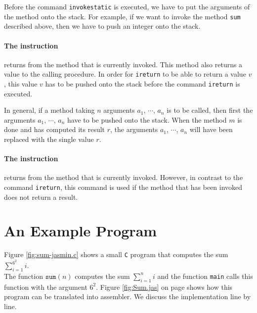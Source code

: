 Before the command \texttt{invokestatic} is executed, we have to put the arguments of the method
onto the stack.  For example, if we want to invoke the method \texttt{sum} described  above, then we
have to push an integer onto the stack.


\paragraph{The instruction }
returns from the method that is currently invoked.  This method also returns a value to the calling
procedure.  In order for \texttt{ireturn} to be able to return a value $v$, this value $v$ has to be
pushed onto the stack before the command \texttt{ireturn} is executed.

In general, if a method taking $n$ arguments $a_1$, $\cdots$, $a_n$ is to be called, then first the
arguments $a_1$, $\cdots$, $a_n$ have to be pushed onto the stack.  When the method $m$ is done and
has computed its result $r$, the arguments $a_1$, $\cdots$, $a_n$ will have been replaced with the
single value $r$.

\paragraph{The instruction }
returns from the method that is currently invoked.  However, in contrast to the command
\texttt{ireturn}, this command is used if the method that has been invoked  does not return a result. 

\section{An Example Program}
Figure \ref{fig:sum-jasmin.c} shows a small \texttt{C} program that computes the sum
\\[0.2cm]
\hspace*{1.3cm}
$\sum\limits_{i=1}^{6^2} i$.
\\[0.2cm]
The function $\mathtt{sum}(n)$ computes the sum $\sum_{i=1}^{n} i$ and the function
\texttt{main} calls this function with the argument $6^2$.  Figure \ref{fig:Sum.jas} on page
\pageref{fig:Sum.jas} shows how this program can be translated 
into assembler.  We discuss the implementation line by line.


